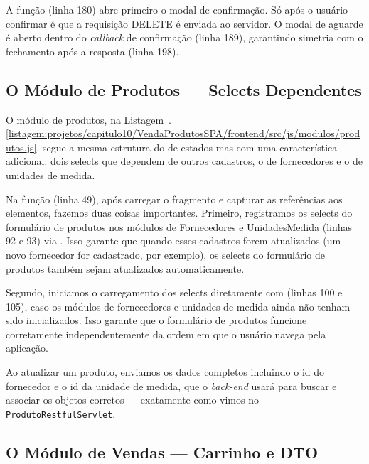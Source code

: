 A função  (linha 180) abre primeiro o modal de confirmação. Só após o usuário confirmar é que a requisição DELETE é enviada ao servidor. O modal de aguarde é aberto dentro do \textit{callback} de confirmação (linha 189), garantindo simetria com o fechamento após a resposta (linha 198).


\subsection{O Módulo de Produtos --- Selects Dependentes}

O módulo de produtos, na Listagem~\thechapter.\ref{listagem:projetos/capitulo10/VendaProdutosSPA/frontend/src/js/modulos/produtos.js}, segue a mesma estrutura do de estados mas com uma característica adicional: dois selects que dependem de outros cadastros, o de fornecedores e o de unidades de medida.


Na função  (linha 49), após carregar o fragmento e capturar as referências aos elementos, fazemos duas coisas importantes. Primeiro, registramos os selects do formulário de produtos nos módulos de Fornecedores e UnidadesMedida (linhas 92 e 93) via . Isso garante que quando esses cadastros forem atualizados (um novo fornecedor for cadastrado, por exemplo), os selects do formulário de produtos também sejam atualizados automaticamente.

Segundo, iniciamos o carregamento dos selects diretamente com  (linhas 100 e 105), caso os módulos de fornecedores e unidades de medida ainda não tenham sido inicializados. Isso garante que o formulário de produtos funcione corretamente independentemente da ordem em que o usuário navega pela aplicação.

Ao atualizar um produto, enviamos os dados completos incluindo o id do fornecedor e o id da unidade de medida, que o \textit{back-end} usará para buscar e associar os objetos corretos --- exatamente como vimos no \texttt{ProdutoRestfulServlet}.


\subsection{O Módulo de Vendas --- Carrinho e DTO}

